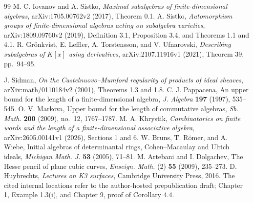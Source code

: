 \begin{thebibliography}{99}
 M. C. Iovanov and A. Sistko,
\emph{Maximal subalgebras of finite-dimensional algebras},
arXiv:1705.00762v2 (2017), Theorem 0.1.
 A. Sistko,
\emph{Automorphism groups of finite-dimensional algebras acting on
subalgebra varieties}, arXiv:1809.09760v2 (2019),
Definition 3.1, Proposition 3.4, and Theorems 1.1 and 4.1.
 R. Gr\"onkvist, E. Leffler, A. Torstensson, and V. Ufnarovski,
\emph{Describing subalgebras of $K[x]$ using derivatives},
arXiv:2107.11916v1 (2021), Theorem 39, pp.~94--95.

 J. Sidman,
\emph{On the Castelnuovo--Mumford regularity of products of ideal sheaves},
arXiv:math/0110184v2 (2001), Theorems 1.3 and 1.8.
 C. J. Pappacena,
An upper bound for the length of a finite-dimensional algebra,
\emph{J. Algebra} \textbf{197} (1997), 535--545.
 O. V. Markova,
Upper bound for the length of commutative algebras,
\emph{Sb. Math.} \textbf{200} (2009), no.~12, 1767--1787.
 M. A. Khrystik,
\emph{Combinatorics on finite words and the length of a finite-dimensional
associative algebra}, arXiv:2605.00141v1 (2026), Sections 1 and 6.
 W. Bruns, T. R\"omer, and A. Wiebe,
Initial algebras of determinantal rings, Cohen--Macaulay and Ulrich ideals,
\emph{Michigan Math. J.} \textbf{53} (2005), 71--81.
 M. Artebani and I. Dolgachev,
The Hesse pencil of plane cubic curves,
\emph{Enseign. Math.} (2) \textbf{55} (2009), 235--273.
 D. Huybrechts,
\emph{Lectures on K3 surfaces}, Cambridge University Press, 2016.
The cited internal locations refer to the author-hosted prepublication draft;
Chapter 1, Example 1.3(i), and Chapter 9, proof of Corollary 4.4.
\end{thebibliography}
